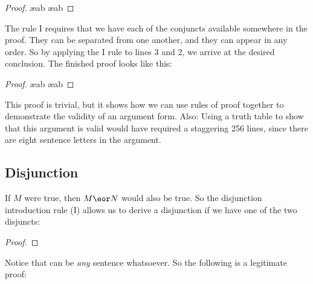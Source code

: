 \begin{proof}
	 \ae{ab}
	 \ae{ab}
\end{proof}

The rule {\eand}I requires that we have each of the conjuncts available somewhere in the proof. They can be separated from one another, and they can appear in any order. So by applying the {\eand}I rule to lines 3 and 2, we arrive at the desired conclusion. The finished proof looks like this:

\begin{proof}

	 \ae{ab}
	 \ae{ab}
	 
\end{proof}

This proof is trivial, but it shows how we can use rules of proof together to demonstrate the validity of an argument form. Also: Using a truth table to show that this argument is valid would have required a staggering 256 lines, since there are eight sentence letters in the argument.




\subsection{Disjunction}
If $M$ were true, then $M \eor N$ would also be true. So the disjunction introduction rule ({\eor}I) allows us to derive a disjunction if we have one of the two disjuncts:

\begin{proof}
\end{proof}

Notice that  can be \emph{any} sentence whatsoever. So the following is a legitimate proof:

